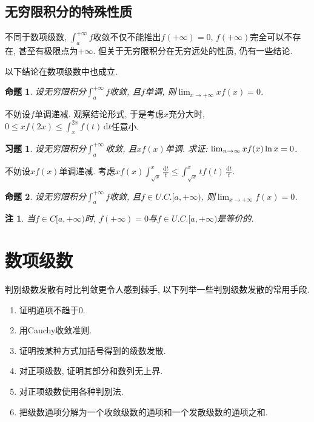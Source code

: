 \documentclass[11pt,a4paper]{ctexart}
\makeatletter
\theoremstyle{thmseries} %
\newtheorem{prop}{命题}[section]
\theoremstyle{exerseries}
\newtheorem{exer}{习题}[section]
\newtheorem*{rem}{注}
\renewenvironment{proof}[1][\proofname]{\par
  \pushQED{\qed}%
  \normalfont \topsep6\p@\@plus6\p@\relax
  \trivlist
  \item[\hskip\labelsep
        \itshape
    #1\@addpunct{}]\ignorespaces
}{%
  \popQED\endtrivlist\@endpefalse
}
\newenvironment{pf}{\begin{proof}[\bfseries\upshape 证\quad]}{\end{proof}}
\renewcommand{\d}{\mathrm{d}}
\def \nti {\mathnormal{n}\to\infty}
\makeatother
\begin{document}
\subsection{无穷限积分的特殊性质}
不同于数项级数, $\int_{a}^{+\infty}f$收敛不仅不能推出$f(+\infty)=0$, $f(+\infty)$完全可以不存在, 甚至有极限点为$+\infty$. 但关于无穷限积分在无穷远处的性质, 仍有一些结论. 

以下结论在数项级数中也成立. 
\begin{prop}
	设无穷限积分$\int_{a}^{+\infty}f$收敛, 且$f$单调, 则$\lim_{x\to+\infty}xf(x)=0$. 
\end{prop}
\begin{pf}
	不妨设$f$单调递减. 观察结论形式, 于是考虑$x$充分大时, $0\leq xf(2x)\leq\int_{x}^{2x}f(t)\,\d t$任意小. 
\end{pf}

\begin{exer}
	设无穷限积分$\int_{a}^{+\infty}$收敛, 且$xf(x)$单调. 求证: $\lim_{\nti}xf(x)\ln x=0$. 
\end{exer}
\begin{pf}
	不妨设$xf(x)$单调递减. 考虑$xf(x)\int_{\sqrt{x}}^{x}\frac{\d t}{t}\leq\int_{\sqrt{x}}^{x}tf(t)\,\frac{\d t}{t}$. 
\end{pf}

\begin{prop}
	设无穷限积分$\int_{a}^{+\infty}f$收敛, 且$f\in U.C.[a,+\infty)$, 则$\lim_{x\to+\infty}f(x)=0$. 
\end{prop}
\begin{rem}
	当$f\in C[a,+\infty)$时, $f(+\infty)=0$与$f\in U.C.[a,+\infty)$是等价的. 
\end{rem}


\section{数项级数}
判别级数发散有时比判敛更令人感到棘手, 以下列举一些判别级数发散的常用手段. 
\begin{enumerate}
	\item 证明通项不趋于$0$. 
	\item 用Cauchy收敛准则. 
	\item 证明按某种方式加括号得到的级数发散. 
	\item 对正项级数, 证明其部分和数列无上界. 
	\item 对正项级数使用各种判别法. 
	\item 把级数通项分解为一个收敛级数的通项和一个发散级数的通项之和. 
\end{enumerate}
\end{document}
